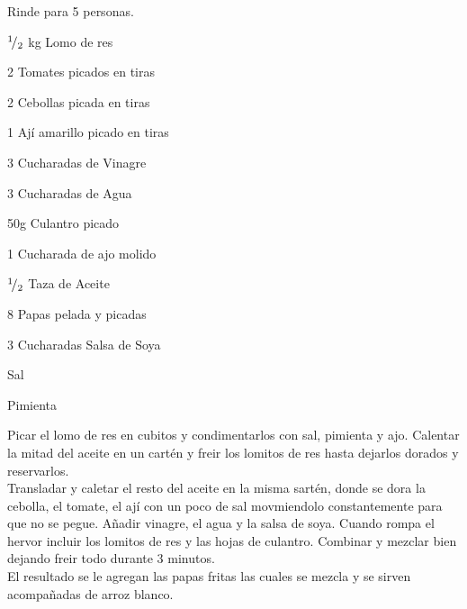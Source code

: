 
Rinde para 5 personas.\\

\begin{ingredientes}
\item ${}^{1}\!/_{2}$ kg Lomo de res
\item 2 Tomates picados en tiras
\item 2 Cebollas picada en tiras
\item 1 Ají amarillo picado en tiras
\item 3 Cucharadas de Vinagre
\item 3 Cucharadas de Agua
\item 50g Culantro picado
\item 1 Cucharada de ajo molido
\item ${}^{1}\!/_{2}$ Taza de Aceite
\item 8 Papas pelada y picadas
\item 3 Cucharadas Salsa de Soya
\item Sal
\item Pimienta
\end{ingredientes}
\preparacion
Picar el lomo de res en cubitos y condimentarlos con sal, pimienta y ajo. Calentar la mitad del aceite en un cartén y freir los lomitos de res hasta dejarlos dorados y reservarlos.\\

Transladar y caletar el resto del aceite en la misma sartén, donde se dora la cebolla, el tomate, el ají con un poco de sal movmiendolo constantemente para que no se pegue. Añadir vinagre, el agua y la salsa de soya. Cuando rompa el hervor incluir los lomitos de res y las hojas de culantro. Combinar y mezclar bien dejando freir todo durante 3 minutos.\\

El resultado se le agregan las papas fritas las cuales se mezcla y se sirven acompañadas de arroz blanco.